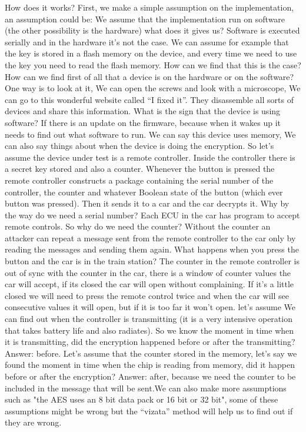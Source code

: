 How does it works? First, we make a simple assumption on the implementation, an assumption could be: We assume that the implementation run on software (the other possibility is the hardware) what does it gives us? Software is executed serially and in the hardware it’s not the case. We can assume for example that the key is stored in a flash memory on the device, and every time we need to use the key you need to read the flash memory. How can we find that this is the case? How can we find first of all that a device is on the hardware or on the software? One way is to look at it, We can open the screws and look with a microscope, We can go to this wonderful website called “I fixed it”. They disassemble all sorts of devices and share this information. What is the sign that the device is using software? If there is an update on the firmware, because when it wakes up it needs to find out what software to run. We can say this device uses memory, We can also say things about when the device is doing the encryption. So let’s assume the device under test is a remote controller. Inside the controller there is a secret key stored and also a counter. Whenever the button is pressed the remote controller constructs a package containing the serial number of the controller, the counter and whatever Boolean state of the button (which ever button was pressed). Then it sends it to a car and the car decrypts it. Why by the way do we need a serial number? Each ECU in the car has program to accept remote controls. So why do we need the counter? Without the counter an attacker can repeat a message sent from the remote controller to the car only by reading the messages and sending them again. What happens when you press the button and the car is in the train station? The counter in the remote controller is out of sync with the counter in the car, there is a window of counter values the car will accept, if its closed the car will open without complaining. If it’s a little closed we will need to press the remote control twice and when the car will see consecutive values it will open, but if it is too far it won’t open. let’s assume We can find out when the controller is transmitting (it is a very intensive operation that takes battery life and also radiates). So we know the moment in time when it is transmitting, did the encryption happened before or after the transmitting? Answer: before. Let’s assume that the counter stored in the memory, let’s say we found the moment in time when the chip is reading from memory, did it happen before or after the encryption? Answer: after, because we need the counter to be included in the message that will be sent.We can also make more assumptions such as "the AES uses an 8 bit data pack or 16 bit or 32 bit", some of these assumptions might be wrong but the “vizata” method will help us to find out if they are wrong. 

